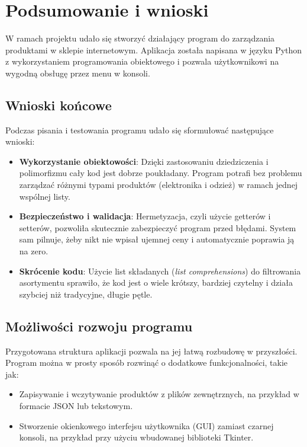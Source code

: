 \documentclass[polish,12pt,oneside,a4paper]{report}
\begin{document}





\newpage



\newpage


\chapter{Podsumowanie i wnioski}

W ramach projektu udało się stworzyć działający program do zarządzania produktami w sklepie internetowym. Aplikacja została napisana w języku Python z wykorzystaniem programowania obiektowego i pozwala użytkownikowi na wygodną obsługę przez menu w konsoli.

\section{Wnioski końcowe}
Podczas pisania i testowania programu udało się sformułować następujące wnioski:
\begin{itemize}
    \item \textbf{Wykorzystanie obiektowości}: Dzięki zastosowaniu dziedziczenia i polimorfizmu cały kod jest dobrze poukładany. Program potrafi bez problemu zarządzać różnymi typami produktów (elektronika i odzież) w ramach jednej wspólnej listy.
    \item \textbf{Bezpieczeństwo i walidacja}: Hermetyzacja, czyli użycie getterów i setterów, pozwoliła skutecznie zabezpieczyć program przed błędami. System sam pilnuje, żeby nikt nie wpisał ujemnej ceny i automatycznie poprawia ją na zero.
    \item \textbf{Skrócenie kodu}: Użycie list składanych (\textit{list comprehensions}) do filtrowania asortymentu sprawiło, że kod jest o wiele krótszy, bardziej czytelny i działa szybciej niż tradycyjne, długie pętle.
\end{itemize}

\section{Możliwości rozwoju programu}
Przygotowana struktura aplikacji pozwala na jej łatwą rozbudowę w przyszłości. Program można w prosty sposób rozwinąć o dodatkowe funkcjonalności, takie jak:
\begin{itemize}
    \item Zapisywanie i wczytywanie produktów z plików zewnętrznych, na przykład w formacie JSON lub tekstowym.
    \item Stworzenie okienkowego interfejsu użytkownika (GUI) zamiast czarnej konsoli, na przykład przy użyciu wbudowanej biblioteki Tkinter.
\end{itemize}
\end{document}
